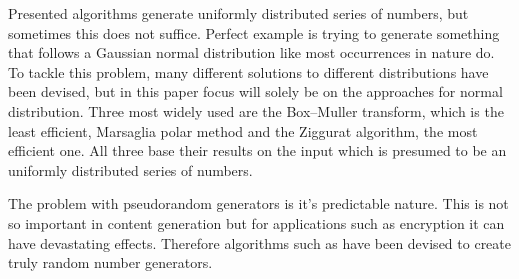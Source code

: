 \documentclass[journal]{IEEEtran}
\begin{document}
Presented algorithms generate uniformly distributed series of numbers, but sometimes this does not suffice. Perfect example is trying to generate something that follows a Gaussian normal distribution like most occurrences in nature do. To tackle this problem, many different solutions to different distributions have been devised, but in this paper focus will solely be on the approaches for normal distribution. Three most widely used are the Box–Muller transform, which is the least efficient, Marsaglia polar method and the Ziggurat algorithm, the most efficient one. All three base their results on the input which is presumed to be an uniformly distributed series of numbers.
\par
The problem with pseudorandom generators is it's predictable nature. This is not so important in content generation but for applications such as encryption it can have devastating effects. Therefore algorithms such as \cite{twoSourceRandomNumGenerator} have been devised to create truly random number generators.
\end{document}
